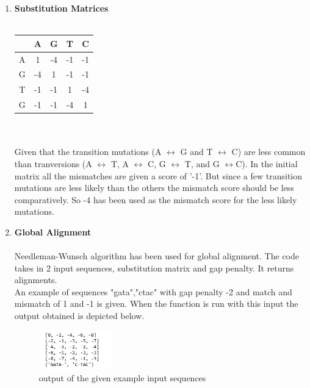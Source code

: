 \documentclass[12pt, oneside]{article}   	%
\begin{document}
\pagestyle{fancy}
\fancyhead{}



\begin{enumerate}
\item \textbf{Substitution Matrices}\\
\\
\begin{tabular}{|c|c|c|c|c|}
\hline
   & A & G & T & C \\
\hline
A & 1 & -4 & -1 & -1 \\
G & -4 & 1 & -1 & -1  \\
T & -1 & -1 & 1 & -4  \\
G & -1 & -1 & -4 & 1  \\
\hline
\end{tabular}\\
\\
 Given that the transition mutations (A $\leftrightarrow$ G and T $\leftrightarrow$ C) are less common than tranversions (A $\leftrightarrow$ T, A $\leftrightarrow$ C, G $\leftrightarrow$ T, and G $\leftrightarrow$C). In the initial matrix all the mismatches are given a score of '-1'. But since a few transition mutations are less likely than the others the mismatch score should be less comparatively. So -4  has been used as the mismatch score for the less likely mutations. 
\item 
\textbf{ Global Alignment }\\
\\
Needleman-Wunsch algorithm has been used for global alignment. The code takes in 2 input sequences, substitution matrix and gap penalty. It returns alignments. 
\\
An example of sequences "gata","ctac" with gap penalty -2 and match and mismatch of 1 and -1 is given. When the function is run with this input the output obtained is depicted below.\\ 

\begin{figure}[H]
    \centering
    \includegraphics[width=0.3\textwidth]{globalegop}
    \caption{\footnotesize{output of the given example input sequences}}
    \label{fig:mesh1}
\end{figure}





\end{enumerate}
\end{document}
